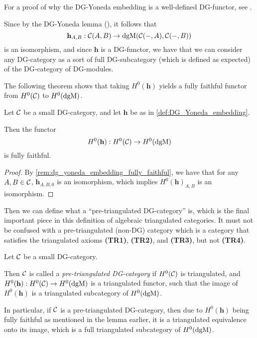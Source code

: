 For a proof of why the DG-Yoneda embedding is a well-defined DG-functor, see \cite[Corollary 6.3.6]{Borceux_1994}.

\begin{remark}
    \label{rem:dg_yoneda_embedding_fully_faithful}
    Since by the DG-Yoneda lemma (\cite[Corollary 6.3.5]{Borceux_1994}), it follows that
    \[
        \mathbf{h}_{A, B}: {\mathcal{C}}(A, B) \to \operatorname{dgM}({\mathcal{C}}(-, A), {\mathcal{C}}(-, B))
    \]
    is an isomorphism, and since \( \mathbf{h} \) is a DG-functor, we have that we can consider any DG-category as a sort of full DG-subcategory (which is defined as expected) of the DG-category of DG-modules.
\end{remark}

The following theorem shows that taking \( H^0(\mathbf{h}) \) yields a fully faithful functor from \( H^0({\mathcal{C}}) \) to \( H^0(\operatorname{dgM}) \).

\begin{lemma}
    Let \( {\mathcal{C}} \) be a small DG-category, and let \( \mathbf{h} \) be as in \autoref{def:DG_Yoneda_embedding}.

    Then the functor
    \[
        H^0(\mathbf{h}): H^0({\mathcal{C}}) \to H^0(\operatorname{dgM})
    \]
    is fully faithful.
\end{lemma}
\begin{proof}
    By \autoref{rem:dg_yoneda_embedding_fully_faithful}, we have that for any \( A, B \in {\mathcal{C}} \), \( \mathbf{h}_{A, B, 0} \) is an isomorphism, which implies \( H^0(\mathbf{h})_{A, B} \) is an isomorphism.
\end{proof}

Then we can define what a ``pre-triangulated DG-category'' is, which is the final important piece in this definition of algebraic triangulated categories. It must not be confused with a pre-triangulated (non-DG) category which is a category that satisfies the triangulated axioms {\bf (TR1)}, {\bf (TR2)}, and {\bf (TR3)}, but not {\bf (TR4)}.
\begin{definition}
    \label{def:pre-tri_dg_cat}
    Let \( {\mathcal{C}} \) be a small DG-category.

    Then \( {\mathcal{C}} \) is called a \emph{pre-triangulated DG-category} if \( H^0({\mathcal{C}}) \) is triangulated, and \( H^0(\mathbf{h}): H^0({\mathcal{C}}) \to H^0(\operatorname{dgM}) \) is a triangulated functor, such that the image of \( H^0(\mathbf{h}) \) is a triangulated subcategory of \( H^0(\operatorname{dgM}) \).
\end{definition}
In particular, if \( {\mathcal{C}} \) is a pre-triangulated DG-category, then due to \( H^0(\mathbf{h}) \) being fully faithful as mentioned in the lemma earlier, it is a triangulated equivalence onto its image, which is a full triangulated subcategory of \( H^0(\operatorname{dgM}) \).

